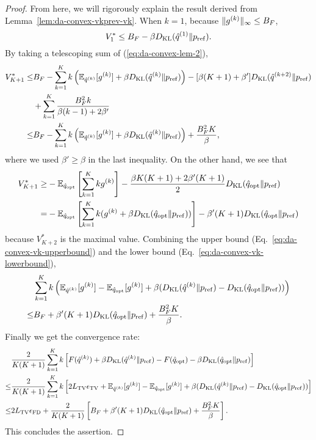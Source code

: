 \begin{proof}
  From here, we will rigorously explain the result derived from Lemma~\ref{lem:da-convex-vkprev-vk}.
  When $k=1$, because $\|{g}^{(k)}\|_\infty\leq B_F$,
  \begin{equation}
    V_1^* \leq B_F - \beta D_{\mathrm{KL}}(\hat{q}^{(1)}\|p_{\rm{ref}}).
  \end{equation}
   By taking a telescoping sum of (\ref{eq:da-convex-lem-2}),
  \begin{align}
    V_{K+1}^* \leq&B_F - \sum_{k=1}^{K} k \left(\mathbb{E}_{\hat{q}^{(k)}}[g^{(k)}] + \beta D_{\mathrm{KL}}(\hat{q}^{(k)}\|p_{\rm{ref}})\right) - [\beta (K+1)+ \beta']D_{\mathrm{KL}}(\hat{q}^{(k+2)}\|p_{\rm{ref}})\\
    &+ \sum_{k=1}^{K}\frac{B_F^2k}{\beta(k-1) + 2\beta'}\\
    \leq&B_F - \sum_{k=1}^{K} k \left(\mathbb{E}_{\hat{q}^{(k)}}[g^{(k)}] + \beta D_{\mathrm{KL}}(\hat{q}^{(k)}\|p_{\rm{ref}})\right) + \frac{B_F^2 K}{\beta},\label{eq:da-convex-vk-upperbound}
  \end{align}
  where we used $\beta' \geq \beta$ in the last inequality. 
  On the other hand, we see that
  \begin{align}
    V_{K+1}^* \geq& - \mathbb{E}_{\hat{q}_{\mathrm{opt}}}\left[\sum_{k=1}^{K}kg^{(k)}\right] - \frac{\beta K(K+1) + 2\beta' (K+1)}{2}D_{\mathrm{KL}}(\hat{q}_{\mathrm{opt}}\|p_{\rm{ref}})\\
    =& - \mathbb{E}_{\hat{q}_{\mathrm{opt}}}\left[\sum_{k=1}^{K}k (g^{(k)} + \beta D_{\mathrm{KL}}(\hat{q}_{\mathrm{opt}}\|p_{\rm{ref}}))\right] - \beta'(K+1)D_{\mathrm{KL}}(\hat{q}_{\mathrm{opt}}\|p_{\rm{ref}})  \label{eq:da-convex-vk-lowerbound}
  \end{align}
  because $V_{K+2}^*$ is the maximal value. Combining the upper bound (Eq.~\ref{eq:da-convex-vk-upperbound}) and the lower bound (Eq.~\ref{eq:da-convex-vk-lowerbound}),
  \begin{align}
    &\sum_{k=1}^{K}k\left(\mathbb{E}_{\hat{q}^{(k)}}[g^{(k)}] - \mathbb{E}_{\hat{q}_{\mathrm{opt}}}[g^{(k)}] + \beta (D_{\mathrm{KL}}(\hat{q}^{(k)}\|p_{\rm{ref}})-D_{\mathrm{KL}}(\hat{q}_{\mathrm{opt}}\|p_{\rm{ref}}))\right)\\
    \leq& B_F + \beta' (K+1)D_{\mathrm{KL}}(\hat{q}_{\mathrm{opt}}\|p_{\rm{ref}}) + \frac{B_F^2 K}{\beta}.
  \end{align}
  Finally we get the convergence rate:
  \begin{align}
    &\frac{2}{K(K+1)}\sum_{k=1}^{K}k \left[ F(\hat{q}^{(k)}) + \beta D_{\mathrm{KL}}(\hat{q}^{(k)}\|p_{\rm{ref}}) - F(\hat{q}_{\mathrm{opt}}) - \beta D_{\mathrm{KL}}(\hat{q}_{\mathrm{opt}}\|p_{\rm{ref}})\right]\\
    \leq&\frac{2}{K(K+1)}\sum_{k=1}^{K}k \left[ 2 L_{\mathrm{TV}}\epsilon_{\mathrm{TV}} +\mathbb{E}_{\hat{q}^{(k)}}[g^{(k)}] - \mathbb{E}_{\hat{q}_{\mathrm{opt}}}[g^{(k)}] + \beta (D_{\mathrm{KL}}(\hat{q}^{(k)}\|p_{\rm{ref}}) - D_{\mathrm{KL}}(\hat{q}_{\mathrm{opt}}\|p_{\rm{ref}}))\right]\\
    \leq&2L_{\mathrm{TV}}\epsilon_{\mathrm{FD}}+\frac{2}{K(K+1)}\left[B_F + \beta'(K+1)D_{\mathrm{KL}}(\hat{q}_{\mathrm{opt}}\|p_{\rm{ref}})  + \frac{ B_F^2 K}{\beta}\right].
  \end{align}
  This concludes the assertion. 
\end{proof}

